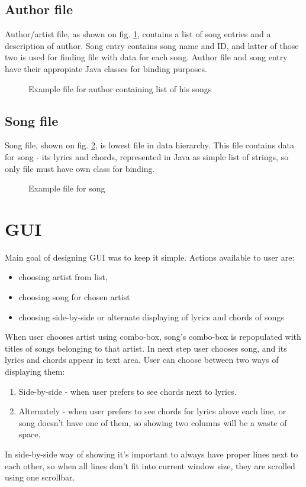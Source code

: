 \documentclass[titlepage]{article}
\begin{document}
\subsection{Author file}
Author/artist file, as shown on fig. \ref{lst:artist}, contains a list of song
entries and a description of author. Song entry contains song name and ID, and
latter of those two is used for finding file with data for each song. Author
file and song entry have their appropiate Java classes for binding purposes.

\begin{figure}

\caption{Example file for author containing list of his songs}
\label{lst:artist}
\end{figure}

\subsection{Song file}
Song file, shown on fig. \ref{lst:song}, is lowest file in data hierarchy. This
file contains data for song - its lyrics and chords, represented in Java as
simple list of strings, so only file must have own class for binding.

\begin{figure}

\caption{Example file for song}
\label{lst:song}
\end{figure}

\section{GUI}
Main goal of designing GUI was to keep it simple. Actions available to user are:
\begin{itemize}
  \item choosing artist from list,
  \item choosing song for chosen artist
  \item choosing side-by-side or alternate displaying of lyrics and chords of
  songs
\end{itemize}
When user chooses artist using combo-box, song's combo-box is repopulated with
titles of songs belonging to that artist. In next step user chooses
song, and its lyrics and chords appear in text area. User can choose between two
ways of displaying them:
\begin{enumerate}
  \item Side-by-side - when user prefers to see chords next to lyrics.
  \item Alternately - when user prefers to see chords for lyrics above each
  line, or song doesn't have one of them, so showing two columns will be a waste
  of space.
\end{enumerate}
In side-by-side way of showing it's important to always have proper lines next
to each other, so when all lines don't fit into current window size, they are
scrolled using one scrollbar.
\end{document}
